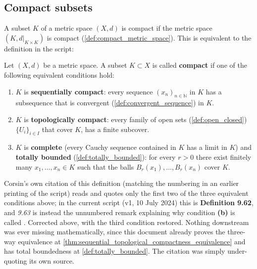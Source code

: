 
\subsection{Compact subsets}

A subset $K$ of a metric space $(X,d)$ is compact if the metric space $(K, d|_{K \times K})$ is
compact (\cref{def:compact_metric_space}). This is equivalent to the definition in the script:

\begin{definition}
\label{def:sequential_topological_compactness}
Let $(X,d)$ be a metric space. A subset $K \subset X$ is called \textbf{compact} if one of the
following equivalent conditions hold:
\begin{enumerate}[label=\textbf{(\alph*)}]
  \item \label{item:seq_compact_def963}
    $K$ is \textbf{sequentially compact}: every sequence $(x_n)_{n\in\mathbb{N}}$ in $K$ has
    a subsequence that is convergent (\cref{def:convergent_sequence}) in $K$.
  \item \label{item:top_compact_def963}
    $K$ is \textbf{topologically compact}: every family of open sets
    (\cref{def:open_closed}) $\{U_i\}_{i \in I}$ that cover $K$, has a finite subcover.
  \item \label{item:complete_totally_bounded_def963}
    $K$ is \textbf{complete} (every Cauchy sequence contained in $K$ has a limit in $K$) and
    \textbf{totally bounded} (\cref{def:totally_bounded}): for every $r>0$ there exist finitely
    many $x_1,\dots,x_n \in K$ such that the balls $B_r(x_1),\dots,B_r(x_n)$ cover $K$.
\end{enumerate}
\end{definition}

\begin{ainote}
Corsin's own citation of this definition (matching the numbering in an earlier printing of the
script) reads  and quotes only the first two of the three equivalent conditions above;
in the current script (v1, 10 July 2024) this is \textbf{Definition 9.62}, and \emph{9.63} is
instead the unnumbered remark explaining why condition \textbf{(b)} is called .
Corrected above, with the third condition restored. Nothing downstream was ever missing
mathematically, since this document already proves the three-way equivalence at
\cref{thm:sequential_topological_compactness_equivalence} and has total boundedness at
\cref{def:totally_bounded}. The citation was simply under-quoting its own source.
\end{ainote}

